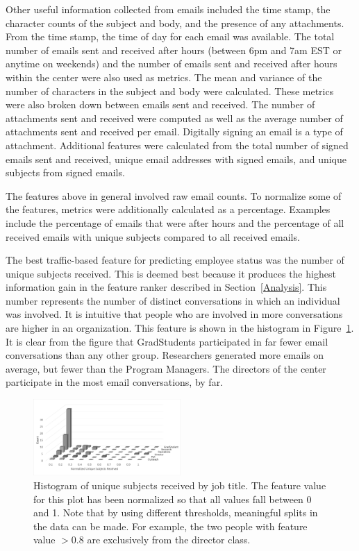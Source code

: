 \documentclass{article}
\begin{document}
Other useful information collected from emails included the time stamp, the character counts of the subject and body, and the presence of any attachments. From the time stamp, the time of day for each email was available.  The total number of emails sent and received after hours (between 6pm and 7am EST or anytime on weekends) and the number of emails sent and received after hours within the center were also used as metrics.  The mean and variance of the number of characters in the subject and body were calculated.  These metrics were also broken down between emails sent and received.  The number of attachments sent and received were computed as well as the average number of attachments sent and received per email.  Digitally signing an email is a type of attachment.  Additional features were calculated from the total number of signed emails sent and received, unique email addresses with signed emails, and unique subjects from signed emails.

The features above in general involved raw email counts.  To normalize some of the features, metrics were additionally calculated as a percentage. Examples include the percentage of emails that were after hours and the percentage of all received emails with unique subjects compared to all received emails.

The best traffic-based feature for predicting employee status was the number of unique subjects received.  This is deemed best because it produces the highest information gain in the feature ranker described in Section~\ref{Analysis}.  This number represents the number of distinct conversations in which an individual was involved.  It is intuitive that people who are involved in more conversations are higher in an organization.  This feature is shown in the histogram in Figure~\ref{fig:traffic_ex_hist}.  It is clear from the figure that GradStudents participated in far fewer email conversations than any other group.  Researchers generated more emails on average, but fewer than the Program Managers.  The directors of the center participate in the most email conversations, by far. 
\begin{figure}[H]
    \centering
        \includegraphics[width=0.5\textwidth]{Unique_subjects_rec_hist}
        \caption{Histogram of unique subjects received by job title.  The feature value for this plot has been normalized so that all values fall between 0 and 1.  Note that by using different thresholds, meaningful splits in the data can be made.  For example, the two people with feature value $> 0.8$ are exclusively from the director class.}
        \label{fig:traffic_ex_hist}
\end{figure}
\end{document}

